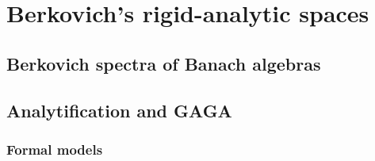 \section{Berkovich's rigid-analytic spaces}
    \subsection{Berkovich spectra of Banach algebras}
    
    \subsection{Analytification and GAGA}
    
    \subsubsection{Formal models}